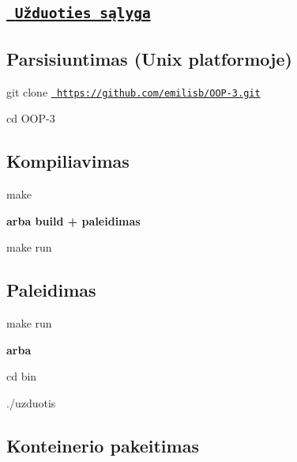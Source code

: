 

\subsection*{\href{https://github.com/objprog/paskaitos2019/wiki/3-oji-užduotis}{\texttt{ Užduoties sąlyga}}}

\subsection*{Parsisiuntimas (Unix platformoje)}


\begin{DoxyItemize}
\item {\ttfamily git clone \href{https://github.com/emilisb/OOP-3.git}{\texttt{ https\+://github.\+com/emilisb/\+O\+O\+P-\/3.\+git}}}
\item {\ttfamily cd O\+O\+P-\/3}
\end{DoxyItemize}

\subsection*{Kompiliavimas}


\begin{DoxyItemize}
\item {\ttfamily make}
\end{DoxyItemize}

{\bfseries{arba build + paleidimas}}


\begin{DoxyItemize}
\item {\ttfamily make run}
\end{DoxyItemize}

\subsection*{Paleidimas}


\begin{DoxyItemize}
\item {\ttfamily make run}
\end{DoxyItemize}

{\bfseries{arba}}


\begin{DoxyItemize}
\item {\ttfamily cd bin}
\item {\ttfamily ./uzduotis}
\end{DoxyItemize}

\subsection*{Konteinerio pakeitimas}


